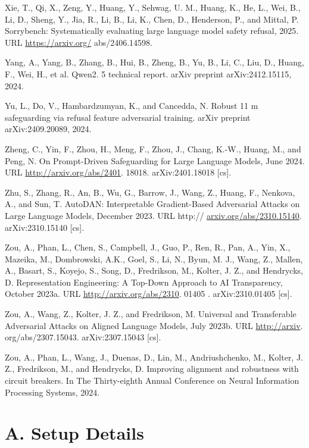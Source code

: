 \documentclass[10pt]{article}
\begin{document}
Xie, T., Qi, X., Zeng, Y., Huang, Y., Sehwag, U. M., Huang, K., He, L., Wei, B., Li, D., Sheng, Y., Jia, R., Li, B., Li, K., Chen, D., Henderson, P., and Mittal, P. Sorrybench: Systematically evaluating large language model safety refusal, 2025. URL \href{https://arxiv.org/}{https://arxiv.org/} abs/2406.14598.

Yang, A., Yang, B., Zhang, B., Hui, B., Zheng, B., Yu, B., Li, C., Liu, D., Huang, F., Wei, H., et al. Qwen2. 5 technical report. arXiv preprint arXiv:2412.15115, 2024.

Yu, L., Do, V., Hambardzumyan, K., and Cancedda, N. Robust 11 m safeguarding via refusal feature adversarial training. arXiv preprint arXiv:2409.20089, 2024.

Zheng, C., Yin, F., Zhou, H., Meng, F., Zhou, J., Chang, K.-W., Huang, M., and Peng, N. On Prompt-Driven Safeguarding for Large Language Models, June 2024. URL \href{http://arxiv.org/abs/2401}{http://arxiv.org/abs/2401}. 18018. arXiv:2401.18018 [cs].

Zhu, S., Zhang, R., An, B., Wu, G., Barrow, J., Wang, Z., Huang, F., Nenkova, A., and Sun, T. AutoDAN: Interpretable Gradient-Based Adversarial Attacks on Large Language Models, December 2023. URL http:// \href{http://arxiv.org/abs/2310.15140}{arxiv.org/abs/2310.15140}. arXiv:2310.15140 [cs].

Zou, A., Phan, L., Chen, S., Campbell, J., Guo, P., Ren, R., Pan, A., Yin, X., Mazeika, M., Dombrowski, A.K., Goel, S., Li, N., Byun, M. J., Wang, Z., Mallen, A., Basart, S., Koyejo, S., Song, D., Fredrikson, M., Kolter, J. Z., and Hendrycks, D. Representation Engineering: A Top-Down Approach to AI Transparency, October 2023a. URL \href{http://arxiv.org/abs/2310}{http://arxiv.org/abs/2310}. 01405 . arXiv:2310.01405 [cs].

Zou, A., Wang, Z., Kolter, J. Z., and Fredrikson, M. Universal and Transferable Adversarial Attacks on Aligned Language Models, July 2023b. URL \href{http://arxiv}{http://arxiv}. org/abs/2307.15043. arXiv:2307.15043 [cs].

Zou, A., Phan, L., Wang, J., Duenas, D., Lin, M., Andriushchenko, M., Kolter, J. Z., Fredrikson, M., and Hendrycks, D. Improving alignment and robustness with circuit breakers. In The Thirty-eighth Annual Conference on Neural Information Processing Systems, 2024.

\section*{A. Setup Details}
\end{document}
